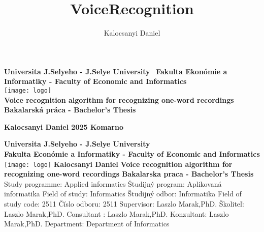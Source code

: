 \documentclass[english,12pt,oneside,a4paper]{article}
\title{VoiceRecognition}
\author{Kalocsanyi Daniel}
\begin{document}
		\begin{center}
		\textbf{Universita J.Selyeho - J.Selye University}
		\
		\textbf{Fakulta Ekonómie a Informatiky - Faculty of Economic and Informatics}
		\\
		\texttt{[image: logo]}
		\\
		\textbf{Voice recognition algorithm for recognizing one-word recordings}
		\vspace{0.5cm}
		\\
		\textbf{Bakalarská práca - Bachelor's Thesis}
	\end{center}
	\begin{flushleft}
		\vspace{11cm}
		\textbf{Kalocsanyi Daniel 2025 Komarno}
	\end{flushleft}
	\newpage
	\textbf{Universita J.Selyeho - J.Selye University}
	\\
	\textbf{Fakulta Económie a Informatiky - Faculty of Economic and Informatics}
	\newline
	\newline
	\newline
	\newline
	\newline
	\texttt{[image: logo]}
	\newline
	\textbf{Kalocsanyi Daniel}
	\newline
	\newline
	\textbf{Voice recognition algorithm for recognizing one-word recordings}
	\newline
	\newline
	\textbf{Bakalarska praca - Bachelor's Thesis}
	\newline
	Study programme: Applied informatics
	\newline
	Študijný program: Aplikovaná informatika
	\newline
	Field of study: Informatics
	\newline
	Študijný odbor: Informatika
	\newline
	Field of study code: 2511
	\newline
    Číslo odboru: 2511 
    \newline
	Supervisor: Laszlo Marak,PhD.
	\newline
	Školiteľ: Laszlo Marak,PhD.
	\newline
	Consultant : Laszlo Marak,PhD.
	\newline
	Konzultant: Laszlo Marak,PhD.
	\newline
	Department: Department of Informatics
	\newline
\end{document}
